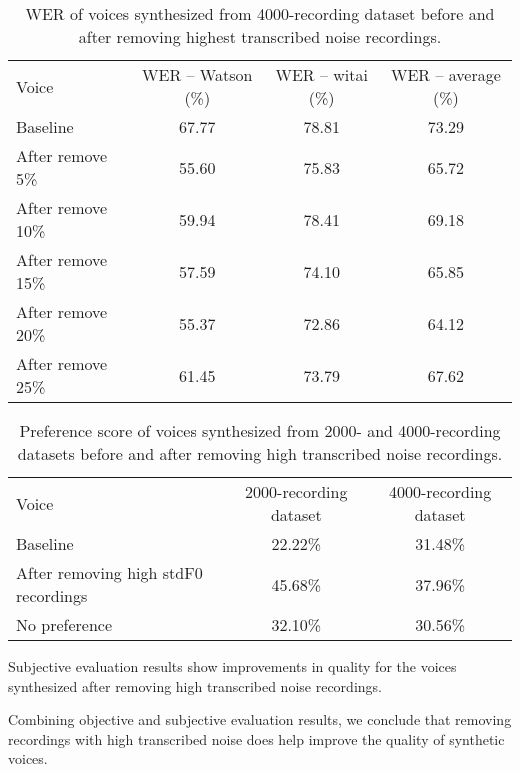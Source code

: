 \documentclass[12pt]{article}
\begin{document}
\begin{table}[]
\begin{center}
\caption{WER of voices synthesized from 4000-recording dataset before and after removing highest transcribed noise recordings.}
\label{tab_werTranscribedNoise4000}
\vspace{3mm}
\begin{tabular}{lccc}
\hline
Voice & WER – Watson (\%) & WER – witai (\%) & WER – average (\%)\\
\cmidrule(l{0pt}r{2pt}){1-1}\cmidrule(l{0pt}r{2pt}){2-2}\cmidrule(l{0pt}r{2pt}){3-3}\cmidrule(l{0pt}r{2pt}){4-4}
Baseline          & 67.77 & 78.81 & 73.29 \\
After remove 5\%  & 55.60 & 75.83 & 65.72 \\
After remove 10\% & 59.94 & 78.41 & 69.18 \\
After remove 15\% & 57.59 & 74.10 & 65.85 \\
After remove 20\% & 55.37 & 72.86 & 64.12 \\
After remove 25\% & 61.45 & 73.79 & 67.62 \\
\hline
\end{tabular}
\end{center}
\end{table}

\begin{table}[]
\begin{center}
\caption{Preference score of voices synthesized from 2000- and 4000-recording datasets before and after removing high transcribed noise recordings.}
\label{tab_subEvaTranscribedNoise}
\vspace{3mm}
\begin{tabular}{lcc}
\hline
Voice & 2000-recording dataset & 4000-recording dataset \\
\cmidrule(l{0pt}r{2pt}){1-1}\cmidrule(l{0pt}r{2pt}){2-2}\cmidrule(l{0pt}r{2pt}){3-3}
Baseline & 22.22\% & 31.48\% \\
After removing high stdF0 recordings & 45.68\% & 37.96\% \\
No preference & 32.10\% & 30.56\% \\
\hline
\end{tabular}
\end{center}
\end{table}

Subjective evaluation results show improvements in quality for the voices synthesized after removing high transcribed noise recordings.

Combining objective and subjective evaluation results, we conclude that removing recordings with high transcribed noise does help improve the quality of synthetic voices.
\end{document}
